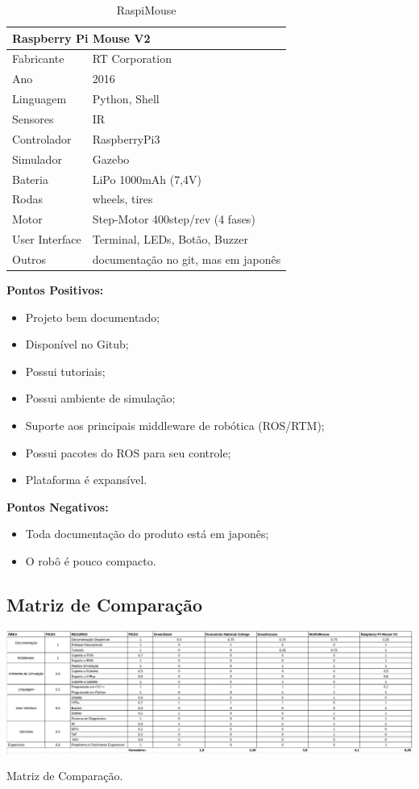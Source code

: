 \begin{table}[]
	\centering
	\begin{tabular}{|l|l|}
		\hline
		\multicolumn{2}{|l|}{\textbf{Raspberry Pi Mouse V2}} \\ \hline
		Fabricante & RT Corporation \\ \hline
		Ano & 2016 \\ \hline
		Linguagem & Python, Shell \\ \hline
		Sensores & IR \\ \hline
		Controlador & RaspberryPi3 \\ \hline
		Simulador & Gazebo \\ \hline
		Bateria & LiPo 1000mAh (7,4V) \\ \hline
		Rodas & wheels, tires \\ \hline
		Motor & Step-Motor 400step/rev (4 fases) \\ \hline
		User Interface & Terminal, LEDs, Botão, Buzzer \\ \hline
		Outros & documentação no git, mas em japonês \\ \hline
	\end{tabular}
	\caption{\label{tab:RaspiMouse} RaspiMouse}
\end{table}

\textbf{Pontos Positivos:}
\begin{itemize}
	\item Projeto bem documentado;
	\item Disponível no Gitub;
	\item Possui tutoriais;
	\item Possui ambiente de simulação;
	\item Suporte aos principais middleware de robótica (ROS/RTM);
	\item Possui pacotes do ROS para seu controle;
	\item Plataforma é expansível.
\end{itemize}

\textbf{Pontos Negativos:}
\begin{itemize}
	\item Toda documentação do produto está em japonês;
	\item O robô é pouco compacto.
\end{itemize}

\subsection{Matriz de Comparação}

\begin{table}[H]
	\centering
	\includegraphics[width=1\textwidth]
	{Figures/MatrizComp.png}
	\caption{\label{tab:MatrizComp} Matriz de Comparação.}
\end{table}
